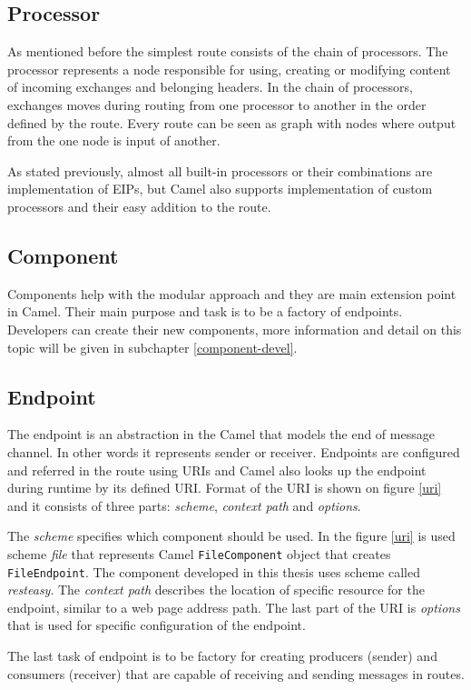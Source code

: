 \documentclass[12pt,final,oneside]{fithesis2}
\begin{document}
\subsection*{Processor}
As mentioned before the simplest route consists of the chain of processors. The processor represents a node responsible for using, creating or modifying content of incoming exchanges and belonging headers. In the chain of processors, exchanges moves during routing from one processor to another in the order defined by the route. Every route can be seen as graph with nodes where output from the one node is input of another.

As stated previously, almost all built-in processors or their combinations are implementation of EIPs, but Camel also supports implementation of custom processors and their easy addition to the route.

\subsection*{Component}
Components help with the modular approach and they are main extension point in Camel. Their main purpose and task is to be a factory of endpoints. Developers can create their new components, more information and detail on this topic will be given in subchapter \ref{component-devel}. 

\subsection*{Endpoint}
The endpoint is an abstraction in the Camel that models the end of message channel. In other words it represents sender or receiver. Endpoints are configured and referred in the route using URIs and Camel also looks up the endpoint during runtime by its defined URI. Format of the URI is shown on figure \ref{uri} and it consists of three parts: \textit{scheme}, \textit{context path} and \textit{options}. 

The \textit{scheme} specifies which component should be used. In the figure \ref{uri} is used scheme \textit{file} that represents Camel \texttt{FileComponent} object that creates \texttt{FileEndpoint}. The component developed in this thesis uses scheme called \textit{resteasy}. The \textit{context path} describes the location of specific resource for the endpoint, similar to a web page address path. The last part of the URI is \textit{options} that is used for specific configuration of the endpoint.

The last task of endpoint is to be factory for creating producers (sender) and consumers (receiver) that are capable of receiving and sending messages in routes.
\end{document}
